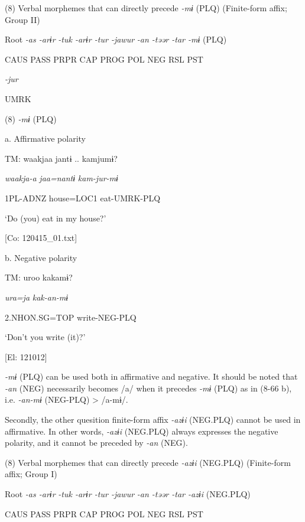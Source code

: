 (8)  Verbal morphemes that can directly precede \textit{-mɨ} (PLQ) (Finite-form affix; Group II)

  Root  \textit{{}-as  {}-arɨr} %
\textit{{}-tuk  {}-arɨr  {}-tur  {}-jawur} %
\textit{{}-an  {}-təər  {}-tar  {}-mɨ} (PLQ)

    CAUS  PASS  PRPR  CAP  PROG  POL  NEG  RSL  PST  

          \textit{{}-jur} 

          UMRK    

(8)  \textit{{}-mɨ} (PLQ)

  a. Affirmative polarity

  TM:  waakjaa  jantɨ ..  kamjumɨ?

    \textit{waakja-a}  \textit{jaa=nantɨ}  \textit{kam{}-jur-mɨ}

    1PL-ADNZ  house=LOC1  eat-UMRK-PLQ

    ‘Do (you) eat in my house?’

    [Co: 120415\_01.txt]

  b. Negative polarity

  TM:  uroo  kakamɨ?

    \textit{ura=ja}  \textit{kak-an-mɨ}

    2.NHON.SG=TOP  write-NEG-PLQ

    ‘Don’t you write (it)?’

    [El: 121012]

\textit{{}-mɨ} (PLQ) can be used both in affirmative and negative. It should be noted that \textit{{}-an} (NEG) necessarily becomes /a/ when it precedes \textit{{}-mɨ} (PLQ) as in (8-66 b), i.e. \textit{{}-an-mɨ} (NEG-PLQ) > /a-mɨ/.

Secondly, the other quesition finite-form affix \textit{{}-azɨi} (NEG.PLQ) cannot be used in affirmative. In other words, \textit{{}-azɨi} (NEG.PLQ) always expresses the negative polarity, and it cannot be preceded by \textit{{}-an} (NEG).

(8)  Verbal morphemes that can directly precede \textit{-azɨi} (NEG.PLQ) (Finite-form affix; Group I)

  Root  \textit{{}-as  {}-arɨr} %
\textit{{}-tuk  {}-arɨr  {}-tur  {}-jawur} %
\textit{{}-an  {}-təər  {}-tar  {}-azɨi} (NEG.PLQ)

    CAUS  PASS  PRPR  CAP  PROG  POL  NEG  RSL  PST  

